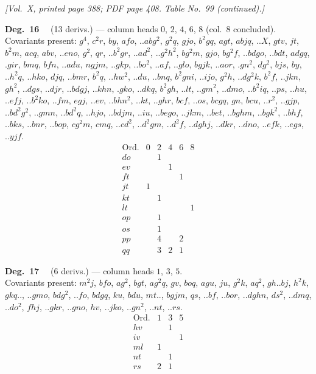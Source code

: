 \documentclass[11pt]{article}
\begin{document}
\newpage

\noindent\textit{[Vol.~X, printed page 388; PDF page 408. Table No.~99 (continued).]}

\bigskip

\noindent\textbf{Deg.~16} \ \ (13 derivs.) --- column heads $0$, $2$, $4$, $6$, $8$ (col.~8 concluded). \\
Covariants present: $g^{4}$, $c^{2}r$, $by$, $afo$, $..abg^{2}$, $g^{2}q$, $gjo$, $b^{2}gq$, $agt$, $abjq$, $..X$, $gtv$, $jt$, $b^{2}m$, $acq$, $abv$, $..eno$, $g^{2}$, $qr$, $..b^{2}gr$, $..ad^{2}$, $..g^{2}h^{2}$, $bg^{2}m$, $gjo$, $bg^{2}f$, $..bdgo$, $..bdt$, $adgq$, $.gir$, $bmq$, $bfn$, $..adu$, $ngjm$, $..gkp$, $..bo^{2}$, $..af$, $..glo$, $bgjk$, $..aor$, $.gn^{2}$, $dg^{2}$, $bjs$, $by$, $..h^{2}q$, $..hko$, $djq$, $..bmr$, $b^{2}q$, $..hw^{2}$, $..du$, $..bnq$, $b^{2}gni$, $..ijo$, $g^{2}h$, $..dg^{2}k$, $b^{2}f$, $..jkn$, $gh^{2}$, $..dgs$, $..djr$, $..bdgj$, $..khn$, $.gko$, $..dkq$, $b^{2}gh$, $..lt$, $..gm^{2}$, $..dmo$, $..b^{2}iq$, $..ps$, $..hu$, $..efj$, $..b^{2}ko$, $..fm$, $egj$, $..ev$, $..bhn^{2}$, $..kt$, $..ghr$, $bcf$, $..os$, $bcgq$, $gn$, $bcu$, $..r^{2}$, $..gjp$, $..bd^{2}g^{2}$, $..gmn$, $..bd^{2}q$, $..hjo$, $..bdjm$, $..iu$, $..bego$, $..jkm$, $..bet$, $..bghm$, $..bgk^{2}$, $..bhf$, $..bks$, $..bnr$, $..bop$, $cg^{2}m$, $cmq$, $..cd^{2}$, $..d^{2}gm$, $..d^{2}f$, $..dghj$, $..dkr$, $..dno$, $..efk$, $..egs$, $..yjf$.
\[
\begin{array}{l|ccccc}
\text{Ord.} & 0 & 2 & 4 & 6 & 8 \\\hline
do & & 1 & & & \\
ev & & & 1 & & \\
ft & & & & 1 & \\
jt & 1 & & & & \\
kt & & 1 & & & \\
lt & & & & & 1 \\
op & & 1 & & & \\
os & & 1 & & & \\
pp & & 4 & & 2 & \\
qq & & 3 & 2 & 1 &
\end{array}
\]

\bigskip

\noindent\textbf{Deg.~17} \ \ (6 derivs.) --- column heads $1$, $3$, $5$. \\
Covariants present: $m^{2}j$, $bfo$, $ag^{2}$, $bgt$, $ag^{2}q$, $gv$, $boq$, $agu$, $ju$, $g^{2}k$, $aq^{2}$, $gh..bj$, $h^{2}k$, $gkq..$, $..gmo$, $bdg^{2}$, $..fo$, $bdgq$, $ku$, $bdu$, $mt..$, $bgjm$, $qs$, $..bf$, $..bor$, $..dghn$, $ds^{2}$, $..dmq$, $..do^{2}$, $fhj$, $..gkr$, $..gno$, $hv$, $..jko$, $..gn^{2}$, $..nt$, $..rs$.
\[
\begin{array}{l|ccc}
\text{Ord.} & 1 & 3 & 5 \\\hline
hv & & 1 & \\
iv & & & 1 \\
ml & 1 & & \\
nt & & 1 & \\
rs & 2 & 1 &
\end{array}
\]
\end{document}

